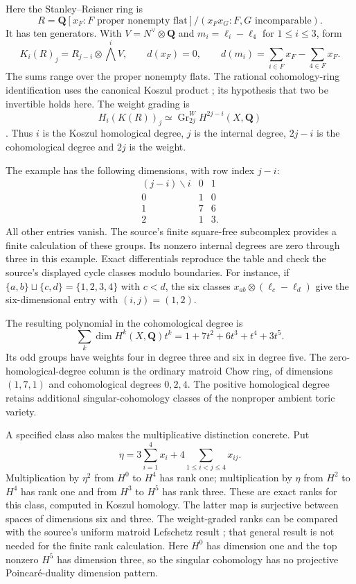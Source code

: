 Here the Stanley--Reisner ring is
\[
 R=\mathbf Q[x_F:F\text{ proper nonempty flat}]/
                 (x_Fx_G:F,G\text{ incomparable}).
\]
It has ten generators. With $V=N^\vee\otimes\mathbf Q$ and
$m_i=\ell_i-\ell_4$ for $1\le i\le3$, form
\[
 K_i(R)_j=R_{j-i}\otimes\bigwedge^iV,
 \qquad d(x_F)=0,\qquad
 d(m_i)=\sum_{i\in F}x_F-\sum_{4\in F}x_F.
\]
The sums range over the proper nonempty flats. The rational
cohomology-ring identification uses the canonical Koszul product
\cite[Theorems~1.1 and~1.2]{FranzFu24Naturality}; its hypothesis
that two be invertible holds here. The weight grading is
\[
 H_i(K(R))_j\simeq
        \operatorname{Gr}^W_{2j}H^{2j-i}(X,\mathbf Q)
\]
\cite[\S\S3.2 and~5]{Weber04ToricWeights}
\cite[\S2.2]{Binder26UniformCohomology}.
Thus $i$ is the Koszul homological degree, $j$ is the internal
degree, $2j-i$ is the cohomological degree and $2j$ is the weight.

The example has the following dimensions, with row index $j-i$:
\[
 \begin{array}{c|rr}
  (j-i)\backslash i&0&1\\\hline
  0&1&0\\
  1&7&6\\
  2&1&3.
 \end{array}
\]
All other entries vanish. The source's finite square-free
subcomplex \cite[Definition~A.4 and Lemma~A.5]
{Binder26SingularCohomology} provides a finite calculation of these
groups. Its nonzero internal degrees are zero through three in
this example. Exact differentials reproduce the table and check
the source's displayed cycle classes modulo boundaries. For
instance, if $\{a,b\}\sqcup\{c,d\}=\{1,2,3,4\}$ with $c<d$, the
six classes $x_{ab}\otimes(\ell_c-\ell_d)$ give the six-dimensional
entry with $(i,j)=(1,2)$.

The resulting polynomial in the cohomological degree is
\[
 \sum_k\dim H^k(X,\mathbf Q)t^k
       =1+7t^2+6t^3+t^4+3t^5.
\]
Its odd groups have weights four in degree three and six in degree
five. The zero-homological-degree column is the ordinary matroid
Chow ring, of dimensions $(1,7,1)$ and cohomological degrees
$0,2,4$. The positive homological degree retains additional
singular-cohomology classes of the nonproper ambient toric variety.

A specified class also makes the multiplicative distinction
concrete. Put
\[
 \eta=3\sum_{i=1}^4x_i+4\sum_{1\le i<j\le4}x_{ij}.
\]
Multiplication by $\eta^2$ from $H^0$ to $H^4$ has rank one;
multiplication by $\eta$ from $H^2$ to $H^4$ has rank one and
from $H^3$ to $H^5$ has rank three. These are exact ranks for
this class, computed in Koszul homology. The latter map is
surjective between spaces of dimensions six and three. The
weight-graded ranks can be compared with the source's uniform
matroid Lefschetz result \cite[Theorem~5.5]
{Binder26UniformCohomology}; that general result is not needed
for the finite rank calculation. Here $H^0$ has dimension one
and the top nonzero $H^5$ has dimension three, so the singular
cohomology has no projective Poincar\'e-duality dimension pattern.

